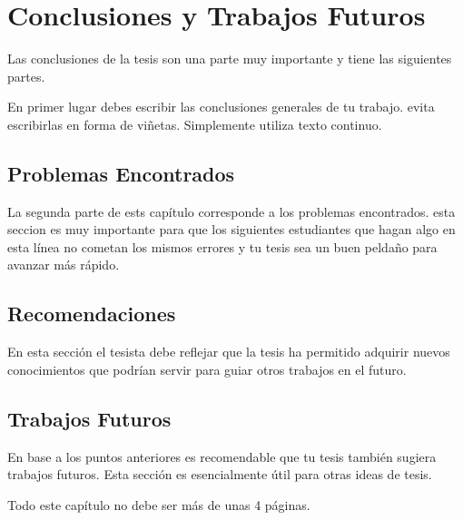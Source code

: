 \chapter{Conclusiones y Trabajos Futuros}\label{chap:conclusiones}

Las conclusiones de la tesis son una parte muy importante y tiene las siguientes partes.

En primer lugar debes escribir las conclusiones generales de tu trabajo. evita escribirlas en forma de viñetas. Simplemente utiliza texto continuo.

\section{Problemas Encontrados}
La segunda  parte de ests capítulo corresponde a los problemas encontrados. esta seccion es muy importante para que los siguientes estudiantes que hagan algo en esta línea no cometan los mismos errores y tu tesis sea un buen peldaño para avanzar más rápido.

\section{Recomendaciones}
En esta sección el tesista debe reflejar que la tesis ha permitido adquirir nuevos conocimientos que podrían servir para guiar otros trabajos en el futuro.

\section{Trabajos Futuros}
En base a los puntos anteriores es recomendable que tu tesis también sugiera trabajos futuros. Esta sección es esencialmente útil para otras ideas de tesis.

Todo este capítulo no debe ser más de unas 4 páginas.
